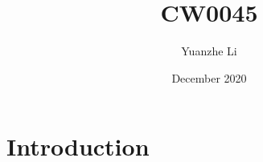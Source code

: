 \documentclass{article}
\title{CW0045}
\author{Yuanzhe Li}
\date{December 2020}
\begin{document}
\maketitle

\section{Introduction}
\end{document}
